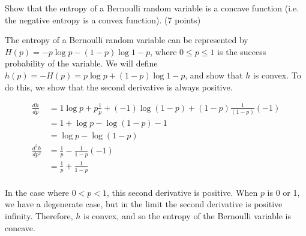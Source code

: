 \documentclass[fleqn]{homework}
\begin{document}
  \begin{problem}{5}
    \begin{question}
      Show that the entropy of a Bernoulli random variable is a concave function
      (i.e. the negative entropy is a convex function). (7 points)
    \end{question}

    The entropy of a Bernoulli random variable can be represented by
    $H(p) = - p \log{p} - (1-p) \log{1-p}$, where $0 \le p \le 1$ is the success
    probability of the variable.  We will define
    $h(p) = -H(p) = p \log{p} + (1-p) \log{1-p}$, and show that $h$ is convex.
    To do this, we show that the second derivative is always positive.

    \begin{align*}
      \frac{dh}{dp} &= 1 \log{p} + p \frac{1}{p} + (-1) \log (1-p) + (1-p) \frac{1}{(1-p)} (-1) \\
                    &= 1 + \log{p} - \log (1-p) - 1 \\
                    &= \log{p} - \log (1-p) \\
      \frac{d^2h}{dp^2} &= \frac{1}{p} - \frac{1}{1-p} (-1) \\
                    &= \frac{1}{p} + \frac{1}{1-p} \\
    \end{align*}

    In the case where $0 < p < 1$, this second derivative is positive.  When $p$
    is 0 or 1, we have a degenerate case, but in the limit the second derivative
    is positive infinity.  Therefore, $h$ is convex, and so the entropy of the
    Bernoulli variable is concave.
  \end{problem}
\end{document}
